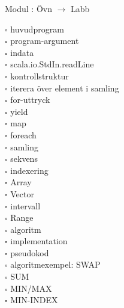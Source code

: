 
    Modul : Övn  $\rightarrow$ Labb \Alert{\texttt{--}}
    \begin{multicols}{3}\SlideFontTiny
    $\square$ huvudprogram \\
$\square$ program-argument \\
$\square$ indata \\
$\square$ scala.io.StdIn.readLine \\
$\square$ kontrollstruktur \\
$\square$ iterera över element i samling \\
$\square$ for-uttryck \\
$\square$ yield \\
$\square$ map \\
$\square$ foreach \\
$\square$ samling \\
$\square$ sekvens \\
$\square$ indexering \\
$\square$ Array \\
$\square$ Vector \\
$\square$ intervall \\
$\square$ Range \\
$\square$ algoritm \\
$\square$ implementation \\
$\square$ pseudokod \\
$\square$ algoritmexempel: SWAP \\
$\square$ SUM \\
$\square$ MIN/MAX \\
$\square$ MIN-INDEX \\
    \end{multicols}
    